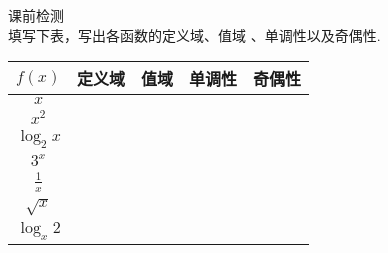   \newtheorem*{Theorem}{定理}
  \makefront
\vspace{-1.5em}
\startexercise
\begin{exercise}{\heiti 课前检测}\\
  填写下表，写出各函数的定义域、值域 、单调性以及奇偶性.
  \begin{center}
    \begin{tabular}{|c|c|c|c|c|}
      \hline
    $f(x)$&\mbox{\hspace{1.5em}定义域\hspace{1.5em}}&\mbox{\hspace{2em}值域\hspace{2em}}&\mbox{\hspace{8em}单调性\hspace{8em}}&\mbox{\hspace{1.2em}奇偶性\hspace{1.2em}}\\
      \hline
      $x$&&&&\\
      \hline
      $x^2$&&&&\\
      \hline
      $\log_2x$&&&&\\
      \hline
      $3^x$&&&&\\
      \hline
      $\frac{1}{x}$&&&&\\
      \hline
      $\sqrt{x}$&&&&\\
      \hline
      $\log_x2$&&&&\\
      \hline
    \end{tabular}\\
  \end{center}
\end{exercise}
